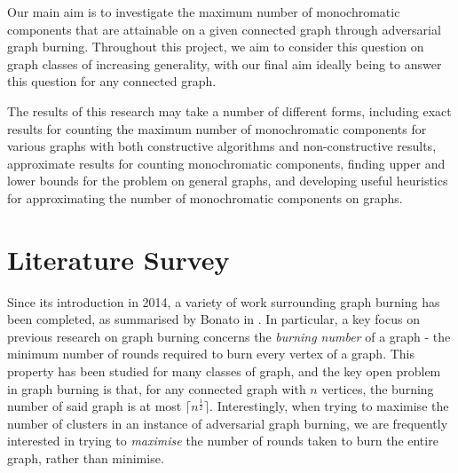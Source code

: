 \documentclass{mprop}
\begin{document}
Our main aim is to investigate the maximum number of monochromatic components that are attainable on a given connected graph through adversarial graph burning. Throughout this project, we aim to consider this question on graph classes of increasing generality, with our final aim ideally being to answer this question for any connected graph.

The results of this research may take a number of different forms, including exact results for counting the maximum number of monochromatic components for various graphs with both constructive algorithms and non-constructive results, approximate results for counting monochromatic components, finding upper and lower bounds for the problem on general graphs, and developing useful heuristics for approximating the number of monochromatic components on graphs.
\section{Literature Survey}

Since its introduction in 2014, a variety of work surrounding graph burning has been completed, as summarised by Bonato in \cite{bonato_survey_2020}. In particular, a key focus on previous research on graph burning concerns the \emph{burning number} of a graph - the minimum number of rounds required to burn every vertex of a graph. This property has been studied for many classes of graph, and the key open problem in graph burning is that, for any connected graph with $n$ vertices, the burning number of said graph is at most $\lceil n^\frac{1}{2} \rceil$. Interestingly, when trying to maximise the number of clusters in an instance of adversarial graph burning, we are frequently interested in trying to \emph{maximise} the number of rounds taken to burn the entire graph, rather than minimise.
\end{document}

